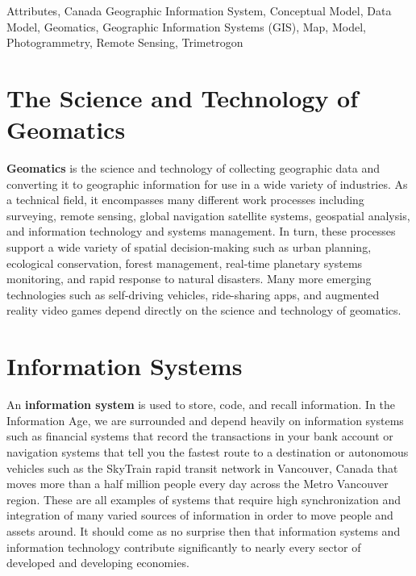 \documentclass[
]{book}
\begin{document}
Attributes, Canada Geographic Information System, Conceptual Model, Data Model, Geomatics, Geographic Information Systems (GIS), Map, Model, Photogrammetry, Remote Sensing, Trimetrogon

\hypertarget{the-science-and-technology-of-geomatics}{%
\section{The Science and Technology of Geomatics}\label{the-science-and-technology-of-geomatics}}

\textbf{Geomatics} is the science and technology of collecting geographic data and converting it to geographic information for use in a wide variety of industries. As a technical field, it encompasses many different work processes including surveying, remote sensing, global navigation satellite systems, geospatial analysis, and information technology and systems management. In turn, these processes support a wide variety of spatial decision-making such as urban planning, ecological conservation, forest management, real-time planetary systems monitoring, and rapid response to natural disasters. Many more emerging technologies such as self-driving vehicles, ride-sharing apps, and augmented reality video games depend directly on the science and technology of geomatics.

\hypertarget{information-systems}{%
\section{Information Systems}\label{information-systems}}

An \textbf{information system} is used to store, code, and recall information. In the Information Age, we are surrounded and depend heavily on information systems such as financial systems that record the transactions in your bank account or navigation systems that tell you the fastest route to a destination or autonomous vehicles such as the SkyTrain rapid transit network in Vancouver, Canada that moves more than a half million people every day across the Metro Vancouver region. These are all examples of systems that require high synchronization and integration of many varied sources of information in order to move people and assets around. It should come as no surprise then that information systems and information technology contribute significantly to nearly every sector of developed and developing economies.
\end{document}
